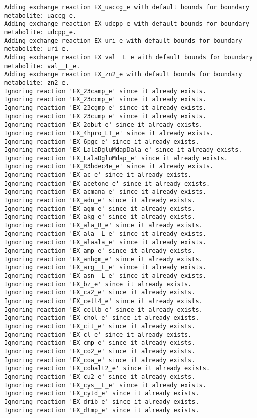 \documentclass[
  letterpaper,
  DIV=11,
  numbers=noendperiod]{scrartcl}
\begin{document}
\begin{verbatim}
Adding exchange reaction EX_uaccg_e with default bounds for boundary metabolite: uaccg_e.
Adding exchange reaction EX_udcpp_e with default bounds for boundary metabolite: udcpp_e.
Adding exchange reaction EX_uri_e with default bounds for boundary metabolite: uri_e.
Adding exchange reaction EX_val__L_e with default bounds for boundary metabolite: val__L_e.
Adding exchange reaction EX_zn2_e with default bounds for boundary metabolite: zn2_e.
Ignoring reaction 'EX_23camp_e' since it already exists.
Ignoring reaction 'EX_23ccmp_e' since it already exists.
Ignoring reaction 'EX_23cgmp_e' since it already exists.
Ignoring reaction 'EX_23cump_e' since it already exists.
Ignoring reaction 'EX_2obut_e' since it already exists.
Ignoring reaction 'EX_4hpro_LT_e' since it already exists.
Ignoring reaction 'EX_6pgc_e' since it already exists.
Ignoring reaction 'EX_LalaDgluMdapDala_e' since it already exists.
Ignoring reaction 'EX_LalaDgluMdap_e' since it already exists.
Ignoring reaction 'EX_R3hdec4e_e' since it already exists.
Ignoring reaction 'EX_ac_e' since it already exists.
Ignoring reaction 'EX_acetone_e' since it already exists.
Ignoring reaction 'EX_acmana_e' since it already exists.
Ignoring reaction 'EX_adn_e' since it already exists.
Ignoring reaction 'EX_agm_e' since it already exists.
Ignoring reaction 'EX_akg_e' since it already exists.
Ignoring reaction 'EX_ala_B_e' since it already exists.
Ignoring reaction 'EX_ala__L_e' since it already exists.
Ignoring reaction 'EX_alaala_e' since it already exists.
Ignoring reaction 'EX_amp_e' since it already exists.
Ignoring reaction 'EX_anhgm_e' since it already exists.
Ignoring reaction 'EX_arg__L_e' since it already exists.
Ignoring reaction 'EX_asn__L_e' since it already exists.
Ignoring reaction 'EX_bz_e' since it already exists.
Ignoring reaction 'EX_ca2_e' since it already exists.
Ignoring reaction 'EX_cell4_e' since it already exists.
Ignoring reaction 'EX_cellb_e' since it already exists.
Ignoring reaction 'EX_chol_e' since it already exists.
Ignoring reaction 'EX_cit_e' since it already exists.
Ignoring reaction 'EX_cl_e' since it already exists.
Ignoring reaction 'EX_cmp_e' since it already exists.
Ignoring reaction 'EX_co2_e' since it already exists.
Ignoring reaction 'EX_coa_e' since it already exists.
Ignoring reaction 'EX_cobalt2_e' since it already exists.
Ignoring reaction 'EX_cu2_e' since it already exists.
Ignoring reaction 'EX_cys__L_e' since it already exists.
Ignoring reaction 'EX_cytd_e' since it already exists.
Ignoring reaction 'EX_drib_e' since it already exists.
Ignoring reaction 'EX_dtmp_e' since it already exists.

\end{verbatim}
\end{document}
